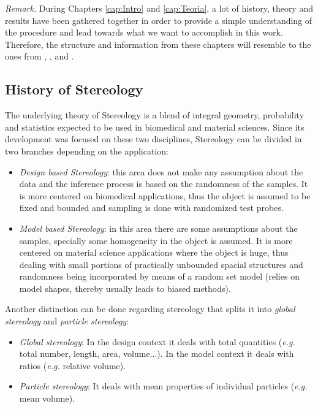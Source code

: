 \textit{Remark.} During Chapters \ref{cap:Intro} and \ref{cap:Teoria}, a lot of history, theory and results have been gathered together in order to provide a simple understanding of the procedure and lead towards what we want to accomplish in this work. Therefore, the structure and information from these chapters will resemble to the ones from \cite{CO.IAS.17.Hist.pdf}, \cite{SterThAppl-2022-07-21.pdf}, \cite{Leobacher_Pillichshammer___2013___Introduction_to_Quasi_Montecarlo_Methods.pdf} and \cite{Hinrichs.pdf}.\\

\subsection{History of Stereology}

The underlying theory of Stereology is a blend of integral geometry, probability and statistics expected to be used in biomedical and material sciences. Since its development was focused on these two disciplines, Stereology can be divided in two branches depending on the application: 
\begin{itemize}
    \item \textit{Design based Stereology}: this area does not make any assumption about the data and the inference process is based on the randomness of the samples. It is more centered on biomedical applications, thus the object is assumed to be fixed and bounded and sampling is done with randomized test probes.
    \item \textit{Model based Stereology}: in this area there are some assumptions about the samples, specially some homogeneity in the object is assumed. It is more centered on material science applications where the object is huge, thus dealing with small portions of practically unbounded spacial structures and randomness being incorporated by means of a random set model (relies on model shapes, thereby usually leads to biased methods).
\end{itemize}
Another distinction can be done regarding stereology that splits it into \textit{global stereology} and \textit{particle stereology}:
\begin{itemize}
    \item \textit{Global stereology}: In the design context it deals with total quantities (\textit{e.g.} total number, length, area, volume...). In the model context it deals with ratios (\textit{e.g.} relative volume).
    \item \textit{Particle stereology}: It deals with mean properties of individual particles (\textit{e.g.} mean volume).
\end{itemize}

